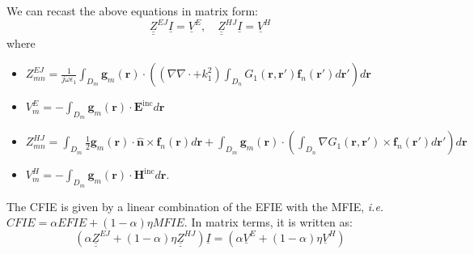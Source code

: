 \documentclass[a4paper,10pt]{book}
\newcommand{\field}[1]{\mathbf{#1}}
\newcommand{\current}[1]{\mathbf{#1}}
\newcommand{\vect}[1]{\mathbf{#1}}
\renewcommand{\arg}[1]{\ensuremath{\!\left(#1\right)}}
\begin{document}
We can recast the above equations in matrix form:
\begin{equation}
\underline{\underline{Z}}^{EJ} \underline{I} = \underline{V}^{E}, \quad \underline{\underline{Z}}^{HJ} \underline{I} = \underline{V}^{H}
\end{equation}
where
\begin{itemize}
\item $Z_{mn}^{EJ} = \frac{1}{j \omega \epsilon_1} \int_{D_m}\vect{g}_m \arg{\vect{r}} \cdot \left( \left(\nabla \nabla \cdot + k_1^2\right) \int_{D_n} G_1\left(\vect{r}, \vect{r}'\right) \current{f}_n\left(\vect{r}'\right) d\vect{r}' \right) d\vect{r}$
\item $V_m^{E} = -\int_{D_m}\vect{g}_m \arg{\vect{r}} \cdot \field{E}^\text{inc} d\vect{r}$
\item $Z_{mn}^{HJ} = \int_{D_m} \frac{1}{2} \vect{g}_m \arg{\vect{r}} \cdot \vect{\hat{n}} \times \current{f}_{n}\arg{\vect{r}}d\vect{r} + \int_{D_m} \vect{g}_m \arg{\vect{r}} \cdot \left(\int_{D_n} \nabla G_1\left(\vect{r}, \vect{r}'\right) \times \current{f}_n\left(\vect{r}'\right) d\vect{r}'\right) d\vect{r}$
\item $V_m^{H} = -\int_{D_m}\vect{g}_m \arg{\vect{r}} \cdot \field{H}^\text{inc} d\vect{r}$.
\end{itemize}
%
\par
The CFIE is given by a linear combination of the EFIE with the MFIE, \textit{i.e.} $CFIE = \alpha EFIE + \left(1-\alpha\right) \eta MFIE$. In matrix terms, it is written as:
\begin{equation}
\left(\alpha\underline{\underline{Z}}^{EJ} + \left(1-\alpha\right)  \eta \underline{\underline{Z}}^{HJ}\right) \underline{I} = \left(\alpha\underline{V}^E + \left(1-\alpha\right)  \eta \underline{V}^{H}\right)
\end{equation}





\end{document}
